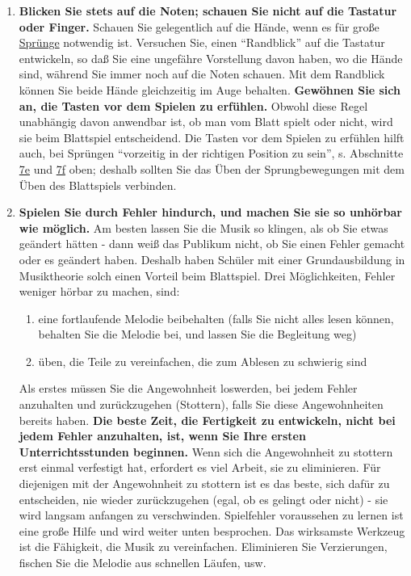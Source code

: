 \begin{enumerate}[label={\arabic*.}] 
\item \textbf{Blicken Sie stets auf die Noten; schauen Sie nicht auf die Tastatur oder Finger.}
Schauen Sie gelegentlich auf die Hände, wenn es für große \hyperlink{c1iii7f}{Sprünge} notwendig ist.
Versuchen Sie, einen \enquote{Randblick} auf die Tastatur entwickeln, so daß Sie eine ungefähre Vorstellung davon haben, wo die Hände sind, während Sie immer noch auf die Noten schauen.
Mit dem Randblick können Sie beide Hände gleichzeitig im Auge behalten.
\textbf{Gewöhnen Sie sich an, die Tasten vor dem Spielen zu erfühlen.}
Obwohl diese Regel unabhängig davon anwendbar ist, ob man vom Blatt spielt oder nicht, wird sie beim Blattspiel entscheidend.
Die Tasten vor dem Spielen zu erfühlen hilft auch, bei Sprüngen \enquote{vorzeitig in der richtigen Position zu sein}, s. Abschnitte \hyperlink{c1iii7e}{7e} und \hyperlink{c1iii7f}{7f} oben; deshalb sollten Sie das Üben der Sprungbewegungen mit dem Üben des Blattspiels verbinden.


\item \textbf{Spielen Sie durch Fehler hindurch, und machen Sie sie so unhörbar wie möglich.}
Am besten lassen Sie die Musik so klingen, als ob Sie etwas geändert hätten - dann weiß das Publikum nicht, ob Sie einen Fehler gemacht oder es geändert haben.
Deshalb haben Schüler mit einer Grundausbildung in Musiktheorie solch einen Vorteil beim Blattspiel.
Drei Möglichkeiten, Fehler weniger hörbar zu machen, sind:

\begin{enumerate}[label={\roman*.}] 
<li>den Rhythmus intakt halten
\item eine fortlaufende Melodie beibehalten (falls Sie nicht alles lesen können, behalten Sie die Melodie bei, und lassen Sie die Begleitung weg)
\item üben, die Teile zu vereinfachen, die zum Ablesen zu schwierig sind
 \end{enumerate}
Als erstes müssen Sie die Angewohnheit loswerden, bei jedem Fehler anzuhalten und zurückzugehen (Stottern), falls Sie diese Angewohnheiten bereits haben.
\textbf{Die beste Zeit, die Fertigkeit zu entwickeln, nicht bei jedem Fehler anzuhalten, ist, wenn Sie Ihre ersten Unterrichtsstunden beginnen.}
Wenn sich die Angewohnheit zu stottern erst einmal verfestigt hat, erfordert es viel Arbeit, sie zu eliminieren.
Für diejenigen mit der Angewohnheit zu stottern ist es das beste, sich dafür zu entscheiden, nie wieder zurückzugehen (egal, ob es gelingt oder nicht) - sie wird langsam anfangen zu verschwinden.
Spielfehler voraussehen zu lernen ist eine große Hilfe und wird weiter unten besprochen.
Das wirksamste Werkzeug ist die Fähigkeit, die Musik zu vereinfachen.
Eliminieren Sie Verzierungen, fischen Sie die Melodie aus schnellen Läufen, usw.


\end{enumerate}
